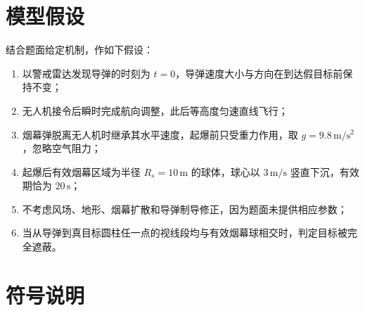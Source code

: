 \section{模型假设}

结合题面给定机制，作如下假设：
\begin{enumerate}
    \item 以警戒雷达发现导弹的时刻为 $t=0$，导弹速度大小与方向在到达假目标前保持不变；
    \item 无人机接令后瞬时完成航向调整，此后等高度匀速直线飞行；
    \item 烟幕弹脱离无人机时继承其水平速度，起爆前只受重力作用，取 $g=9.8\,\mathrm{m/s^2}$，忽略空气阻力；
    \item 起爆后有效烟幕区域为半径 $R_s=10\,\mathrm{m}$ 的球体，球心以 $3\,\mathrm{m/s}$ 竖直下沉，有效期恰为 $20\,\mathrm{s}$；
    \item 不考虑风场、地形、烟幕扩散和导弹制导修正，因为题面未提供相应参数；
    \item 当从导弹到真目标圆柱任一点的视线段均与有效烟幕球相交时，判定目标被完全遮蔽。
\end{enumerate}

\section{符号说明}

